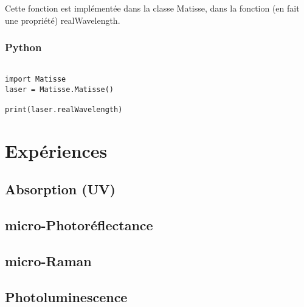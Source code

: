 \documentclass[11pt,francais]{book} %
\begin{document}
Cette fonction est implémentée dans la classe Matisse, dans la fonction (en fait une propriété) realWavelength.

\subsection{Python}

\begin{lstlisting}[frame=single,caption={Exemple d'utilisation du Wavemeter avec Python},label={lst:exwavemeter},breaklines=true,]  % Start your code-block

import Matisse
laser = Matisse.Matisse()

print(laser.realWavelength)
\end{lstlisting}




\chapter{Expériences}

\section{Absorption (UV)}

\section{micro-Photoréflectance}

\section{micro-Raman}

\section{Photoluminescence}
\end{document}
